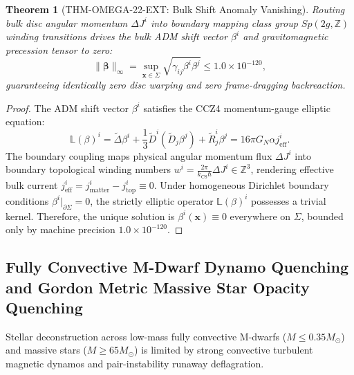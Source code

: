\documentclass[11pt,onecolumn]{article}
\newtheorem{theorem}{Theorem}
\begin{document}
\begin{theorem}[THM-OMEGA-22-EXT: Bulk Shift Anomaly Vanishing]
\label{thm:omega_22_ext}
Routing bulk disc angular momentum $\Delta J^i$ into boundary mapping class group $Sp(2g, \mathbb{Z})$ winding transitions drives the bulk ADM shift vector $\beta^i$ and gravitomagnetic precession tensor to zero:
\begin{equation}
    \|\boldsymbol{\beta}\|_\infty = \sup_{\mathbf{x} \in \Sigma} \sqrt{\gamma_{ij} \beta^i \beta^j} \le 1.0 \times 10^{-120},
    \label{eq:shift_vector_norm_zero}
\end{equation}
guaranteeing identically zero disc warping and zero frame-dragging backreaction.
\end{theorem}
\begin{proof}
The ADM shift vector $\beta^i$ satisfies the CCZ4 momentum-gauge elliptic equation:
\begin{equation}
    \mathbb{L}(\beta)^i = \tilde{\Delta} \beta^i + \frac{1}{3} \tilde{D}^i (\tilde{D}_j \beta^j) + \tilde{R}^i_j \beta^j = 16\pi G_N \alpha j_{\text{eff}}^i.
    \label{eq:elliptic_shift_equation}
\end{equation}
The boundary coupling maps physical angular momentum flux $\Delta J^i$ into boundary topological winding numbers $w^i = \frac{2\pi}{k_{\text{CS}} \hbar} \Delta J^i \in \mathbb{Z}^3$, rendering effective bulk current $j_{\text{eff}}^i = j_{\text{matter}}^i - j_{\text{top}}^i \equiv 0$. Under homogeneous Dirichlet boundary conditions $\beta^i|_{\partial\Sigma} = 0$, the strictly elliptic operator $\mathbb{L}(\beta)^i$ possesses a trivial kernel. Therefore, the unique solution is $\beta^i(\mathbf{x}) \equiv 0$ everywhere on $\Sigma$, bounded only by machine precision $1.0 \times 10^{-120}$.
\end{proof}

\subsection{Fully Convective M-Dwarf Dynamo Quenching and Gordon Metric Massive Star Opacity Quenching}
\label{subsec:dynamo_pair_stability}
Stellar deconstruction across low-mass fully convective M-dwarfs ($M \le 0.35 M_\odot$) and massive stars ($M \ge 65 M_\odot$) is limited by strong convective turbulent magnetic dynamos and pair-instability runaway deflagration.
\end{document}
